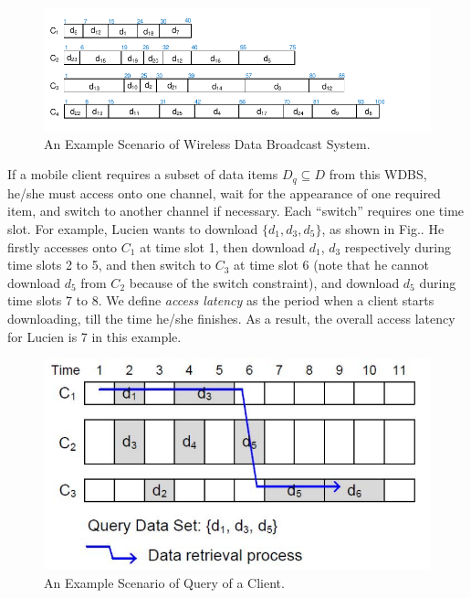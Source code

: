 \documentclass[12pt,a4paper]{article}
\theoremstyle{definition}
\begin{document}
\begin{enumerate}
\begin{figure}[h]
	\centering
	\includegraphics[scale=1]{Fig-Broadcast.pdf}
	\caption{An Example Scenario of Wireless Data Broadcast System.} \label{Fig-Broadcast}
\end{figure}

If a mobile client requires a subset of data items $D_q \subseteq D$ from this WDBS, he/she must access onto one channel, wait for the appearance of one required item, and switch to another channel if necessary. Each ``switch'' requires one time slot. For example, Lucien wants to download $\{d_1, d_3, d_5\}$, as shown in Fig.. He firstly accesses onto $C_1$ at time slot 1, then download $d_1$, $d_3$ respectively during time slots 2 to 5, and then switch to $C_3$ at time slot 6 (note that he cannot download $d_5$ from $C_2$ because of the switch constraint), and download $d_5$ during time slots 7 to 8. We define \emph{access latency} as the period when a client starts downloading, till the time he/she finishes. As a result, the overall access latency for Lucien is 7 in this example.

\begin{figure}[!htbp]
	\centering
	\includegraphics[scale= 0.5]{Fig-Access.pdf}
	\caption{An Example Scenario of Query of a Client.} \label{Fig-Access}
\end{figure}


\end{enumerate}
\end{document}
